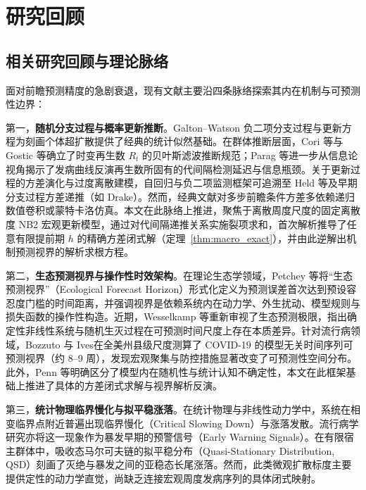 \documentclass[11pt,a4paper]{article}
\theoremstyle{plain}
\theoremstyle{definition}
\begin{document}
\section{研究回顾}\label{sec:review}

\subsection{相关研究回顾与理论脉络}

面对前瞻预测精度的急剧衰退，现有文献主要沿四条脉络探索其内在机制与可预测性边界：

第一，\textbf{随机分支过程与概率更新推断}。Galton--Watson 负二项分支过程\citep{athreya1972branching}与更新方程为刻画个体超扩散提供了经典的统计似然基础\citep{lloyd-smith2005superspreading}。在群体推断层面，Cori 等\citep{cori2013framework}与 Gostic 等\citep{gostic2020practical}确立了时变再生数 $R_t$ 的贝叶斯滤波推断规范；Parag 等\citep{parag2020information, parag2022fundamental, parag2022quantifying}进一步从信息论视角揭示了发病曲线反演再生数所固有的代间隔检测延迟与信息瓶颈。关于更新过程的方差演化与过度离散建模，自回归与负二项监测框架可追溯至 Held 等\citep{held2017monitoring}及早期分支过程方差递推（如 Drake\citep{drake2006limits}）。然而，经典文献对多步前瞻条件方差多依赖递归数值卷积或蒙特卡洛仿真。本文在此脉络上推进，聚焦于离散周度尺度的固定离散度 NB2 宏观更新模型，通过对代间隔递推关系实施裂项求和，首次解析推导了任意有限提前期 $h$ 的精确方差闭式解（定理~\ref{thm:macro_exact}），并由此逆解出机制预测视界的解析求根方程。

第二，\textbf{生态预测视界与操作性时效架构}。在理论生态学领域，Petchey 等\citep{petchey2015ecological}将“生态预测视界”（Ecological Forecast Horizon）形式化定义为预测误差首次达到预设容忍度门槛的时间距离，并强调视界是依赖系统内在动力学、外生扰动、模型规则与损失函数的操作性构造。近期，Wesselkamp 等\citep{wesselkamp2025forecast}重新审视了生态预测极限，指出确定性非线性系统与随机生灭过程在可预测时间尺度上存在本质差异。针对流行病领域，Bozzuto 与 Ives\citep{bozzuto2023differences}在全美州县级尺度测算了 COVID-19 的模型无关时间序列可预测视界（约 8--9 周），发现宏观聚集与防控措施显著改变了可预测性空间分布。此外，Penn 等\citep{penn2023intrinsic}明确区分了模型内在随机性与统计认知不确定性，本文在此框架基础上推进了具体的方差闭式求解与视界解析反演。

第三，\textbf{统计物理临界慢化与拟平稳涨落}。在统计物理与非线性动力学中，系统在相变临界点附近普遍出现临界慢化（Critical Slowing Down）与涨落发散\citep{grassberger1983critical}。流行病学研究亦将这一现象作为暴发早期的预警信号（Early Warning Signals）\citep{oregan2013theory, southall2021early}。在有限宿主群体中，吸收态马尔可夫链的拟平稳分布（Quasi-Stationary Distribution, QSD）刻画了灭绝与暴发之间的亚稳态长尾涨落\citep{darroch1965quasi, nasell1999quasi, dolgoarshinnykh2006critical}。然而，此类微观扩散标度主要提供定性的动力学直觉，尚缺乏连接宏观周度发病序列的具体闭式映射。
\end{document}

